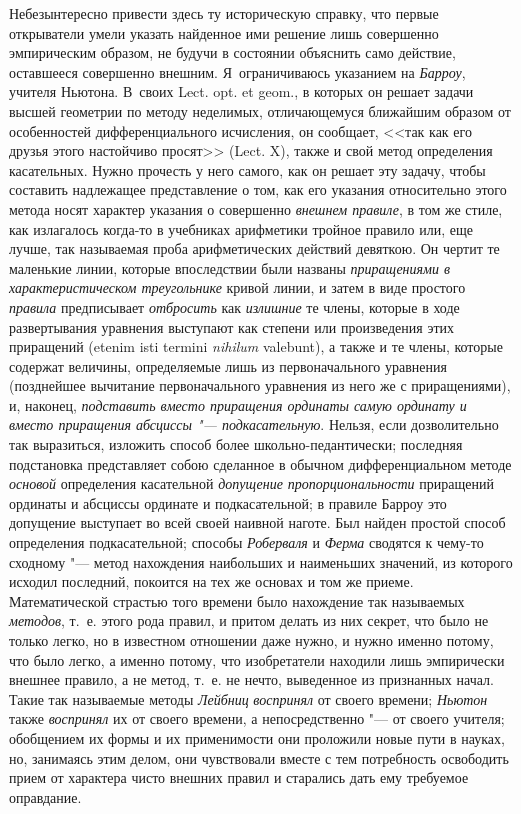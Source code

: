 Небезынтересно привести здесь ту историческую справку, что первые
открыватели умели указать найденное ими решение лишь совершенно
эмпирическим образом, не будучи в состоянии объяснить само действие,
оставшееся совершенно внешним. Я~ограничиваюсь указанием на
{\em Барроу}, учителя Ньютона. В~своих Lect. opt. et
geom., в которых он решает задачи высшей геометрии по методу неделимых,
отличающемуся ближайшим образом от особенностей дифференциального
исчисления, он сообщает, <<так как его друзья этого настойчиво просят>>
(Lect. X), также и свой метод определения касательных. Нужно прочесть у
него самого, как он решает эту задачу, чтобы составить надлежащее
представление о том, как его указания относительно этого метода носят
характер указания о совершенно {\em внешнем правиле}, в
том же стиле, как излагалось когда-то в учебниках арифметики тройное
правило или, еще лучше, так называемая проба арифметических действий
девяткою. Он чертит те
маленькие линии, которые впоследствии были названы
{\em приращениями в характеристическом треугольнике}
кривой линии, и затем в виде простого {\em правила}
предписывает {\em отбросить} как
{\em излишние} те члены, которые в ходе развертывания
уравнения выступают как степени или произведения этих приращений (etenim
isti termini {\em nihilum} valebunt), а также и те члены,
которые содержат величины, определяемые лишь из первоначального уравнения
(позднейшее вычитание первоначального уравнения из него же с приращениями),
и, наконец, {\em подставить вместо приращения ординаты
самую ординату и вместо приращения абсциссы "--- подкасательную}. Нельзя, если
дозволительно так выразиться, изложить способ более школьно-педантически;
последняя подстановка представляет собою сделанное в обычном
дифференциальном методе {\em основой} определения
касательной {\em допущение пропорциональности}
приращений ординаты и абсциссы ординате и подкасательной; в правиле Барроу
это допущение выступает во всей своей наивной наготе. Был найден простой
способ определения подкасательной; способы
{\em Роберваля} и {\em Ферма}
сводятся к чему-то сходному "--- метод нахождения наибольших и наименьших
значений, из которого исходил последний, покоится на тех же основах и том
же приеме. Математической страстью того времени было нахождение так
называемых {\em методов}, т.~е. этого рода правил, и
притом делать из них секрет, что было не только легко, но в известном
отношении даже нужно, и нужно именно потому, что было легко, а именно
потому, что изобретатели находили лишь эмпирически внешнее правило, а не
метод, т.~е. не нечто, выведенное из признанных начал. Такие так называемые
методы {\em Лейбниц}
{\em воспринял} от своего времени; {\em Ньютон} также {\em воспринял}
их от своего времени, а непосредственно "--- от своего учителя; обобщением их
формы и их применимости они проложили новые пути в науках, но, занимаясь
этим делом, они чувствовали вместе с тем потребность освободить прием от
характера чисто внешних правил и старались дать ему требуемое оправдание.

